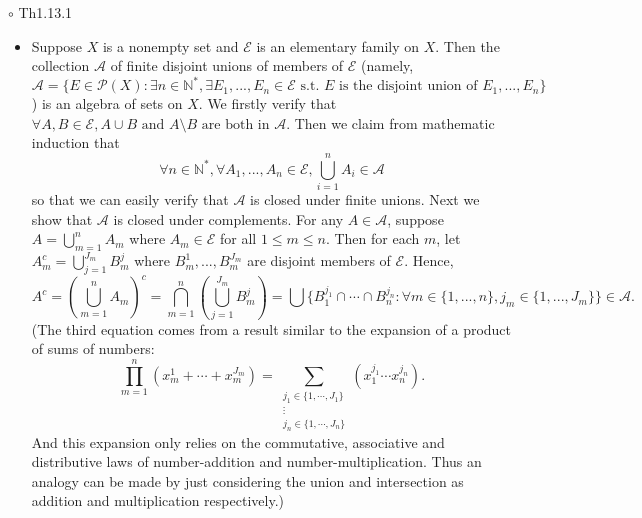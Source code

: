 \documentclass{article}
\begin{document}
{\Large $\circ $ Th1.13.1}\par
\begin{itemize}
    \item[]
    {\large Suppose $X$ is a nonempty set and $\mathcal{E}$ is an elementary family on $X$. Then the collection
    $\mathcal{A}$ of finite disjoint unions of members of $\mathcal{E}$ 
    (namely, $\mathcal{A}=\{E\in \mathcal{P}(X):\exists n\in\mathbb{N}^\ast, \exists E_1,...,E_n\in \mathcal{E} 
    \text{ s.t. } E \text{ is the disjoint union of } E_1,...,E_n \}$) is an algebra of sets on $X$.}
    {\textcolor{pf}{We firstly verify that $\forall A,B\in \mathcal{E}, A\cup B\text{ and } A\setminus B 
    \text{ are both in } \mathcal{A}$. Then we claim from mathematic induction that 
    $$\forall n\in\mathbb{N}^\ast ,\forall A_1,...,A_n\in\mathcal{E}, \bigcup_{i=1}^n A_i \in \mathcal{A}$$
    so that we can easily verify that $\mathcal{A}$ is closed under finite unions. Next we show that $\mathcal{A}$
    is closed under complements. For any $A\in\mathcal{A}$, suppose $A=\bigcup_{m=1}^n A_m$ where $A_m\in\mathcal{E}$
    for all $1\leqslant m\leqslant n$. Then for each $m$, let $A_m^c = \bigcup_{j=1}^{J_m} B_m^j $ where 
    $B_m^1,...,B_m^{J_m}$ are disjoint members of $\mathcal{E}$. Hence, 
    $$A^c = \left(\bigcup_{m=1}^{n}A_{m}\right)^{c}=\bigcap_{m=1}^{n}\left(\bigcup_{j=1}^{J_{m}}B_{m}^{j}\right)
    =\bigcup\{B_{1}^{j_{1}}\cap\cdots\cap B_{n}^{j_{n}}:\forall m\in\{1,...,n\},j_{m}\in \{1,...,J_m\}\}\in \mathcal{A}.$$
    (The third equation comes from a result similar to the expansion of a product of sums of numbers:
    $$\prod_{m=1}^n(x_m^1+\cdots+x_m^{J_m})=\sum_{
        \begin{array}
            {c}j_1\in\{1,\cdots,J_1\}\\\vdots\\j_n\in\{1,\cdots,J_n\}
        \end{array}
        }(x_1^{j_1}\cdots x_n^{j_n}).$$
    And this expansion only relies on the commutative, associative and distributive laws of number-addition and 
    number-multiplication. Thus an analogy can be made by just considering the union and intersection 
    as addition and multiplication respectively.)}}
\end{itemize}\par
\quad
\end{document}
